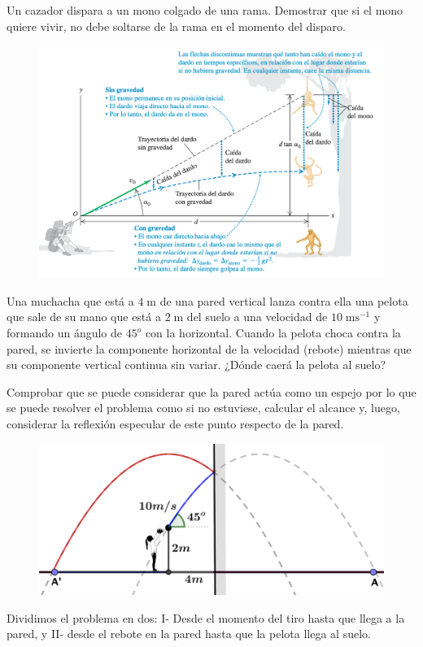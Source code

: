 \begin{prob} Un cazador dispara a un mono colgado de una rama. Demostrar que si el mono quiere vivir, no debe soltarse de la rama en el momento del disparo.
\end{prob}	
\begin{figure}[H]
		\centering
		\includegraphics[width=1\textwidth]{imagenes/imagenes02/T02IM21.png}
		\end{figure}		





\begin{prob}
Una muchacha que está a $4\;\mathrm{m}$ de una pared vertical lanza contra ella una pelota que sale de su mano que está a $2 \; \mathrm{m}$ del suelo a una velocidad de $10\;\mathrm{ms}^{-1}$ y formando un ángulo de $45^o$ con la horizontal. Cuando la pelota choca contra la pared, se invierte la componente horizontal de la velocidad (rebote) mientras	 que su componente vertical continua sin variar. ¿Dónde caerá la pelota al suelo?

Comprobar que se puede considerar que la pared actúa como un espejo por lo que se puede resolver el problema como si no estuviese, calcular el alcance y, luego, considerar la reflexión especular de este punto respecto de la pared.
\end{prob}
\begin{figure}[H]
		\centering
		\includegraphics[width=.9\textwidth]{imagenes/imagenes02/T02IM24.png}
		\end{figure}
Dividimos el problema en dos: I- Desde el momento del tiro hasta que llega a la pared, y II- desde el rebote en la pared hasta que la pelota llega al suelo.

